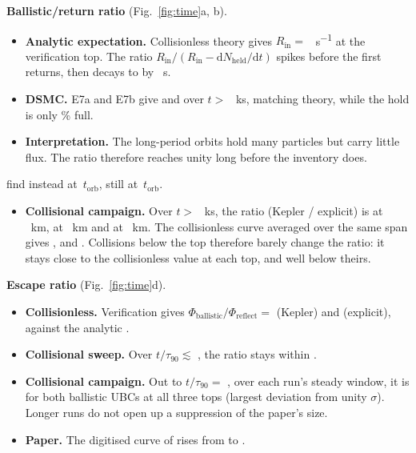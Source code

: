 \documentclass[10pt]{article}
\newcommand{\para}[1]{\textbf{#1}\hspace{0.5em}}
\newcommand{\sinv}{s\textsuperscript{−1}}
\newcommand{\torb}{t_\mathrm{orb}}
\newcommand{\tauf}{\tau_{90}}
\begin{document}
\para{Ballistic/return ratio} (Fig.~\ref{fig:time}a, b).
\begin{itemize}
  \item \textbf{Analytic expectation.} Collisionless theory gives $R_\mathrm{in} = $ \anRinVer{}~\sinv{} at the verification top. The ratio $R_\mathrm{in}/(R_\mathrm{in} - \mathrm{d}N_\mathrm{held}/\mathrm{d}t)$ spikes before the first returns, then decays to \anInRetVerEnd{} by \verTend{}~s.
  \item \textbf{DSMC.} E7a and E7b give \verInRetKepler{} and \verInRetExplicit{} over $t > $ \verTzero{}~ks, matching theory, while the hold is only \heldFracVerEnd{}\% full.
  \item \textbf{Interpretation.} The long-period orbits hold many particles but carry little flux. The ratio therefore reaches unity long before the inventory does.
\end{itemize}
\citet{cm21} find instead \pInRetStart{} at \pFigThreeTlo{}\,$\torb$, still \pInRetEnd{} at \pFigThreeThi{}\,$\torb$.
\begin{itemize}
  \item \textbf{Collisional campaign.} Over $t > $ \campLateKs{}~ks, the ratio (Kepler / explicit) is \campInRetTop{} at \campZTop{}~km, \campInRetMid{} at \campZMid{}~km and \campInRetLow{} at \campZLow{}~km. The collisionless curve averaged over the same span gives \anInRetCampTop{}, \anInRetCampMid{} and \anInRetCampLow{}. Collisions below the top therefore barely change the ratio: it stays close to the collisionless value at each top, and well below theirs.
\end{itemize}

\para{Escape ratio} (Fig.~\ref{fig:time}d).
\begin{itemize}
  \item \textbf{Collisionless.} Verification gives $\Phi_\mathrm{ballistic}/\Phi_\mathrm{reflect} = $ \verPhiRatioKepler{} (Kepler) and \verPhiRatioExplicit{} (explicit), against the analytic \anPhiRatioVer{}.
  \item \textbf{Collisional sweep.} Over $t/\tauf \lesssim$ \sweepTendOverTau{}, the ratio stays within \sweepPhiRatioRange{}.
  \item \textbf{Collisional campaign.} Out to $t/\tauf = $ \campTendOverTau{}, over each run's steady window, it is \campPhiRatioRange{} for both ballistic UBCs at all three tops (largest deviation from unity \campPhiRatioPullMax{}$\sigma$). Longer runs do not open up a suppression of the paper's size.
  \item \textbf{Paper.} The digitised curve of \citet{cm21} rises from \pPhiRatioStart{} to \pPhiRatioEnd{}.
\end{itemize}
\end{document}
